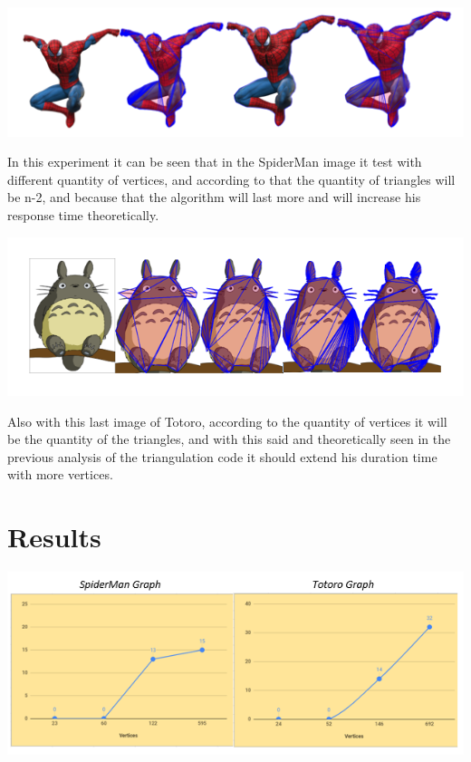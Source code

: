 \documentclass[conference]{IEEEtran}
\begin{document}
\includegraphics[scale=0.6]{spideyresults.png}

In this experiment it can be seen that in the SpiderMan image it test with different quantity of vertices, and according to that the quantity of triangles will be n-2, and because that the algorithm will last more and will increase his response time theoretically.

\includegraphics[scale=0.53]{totoroResults.png}

Also with this last image of Totoro, according to the quantity of vertices it will be the quantity of the triangles, and with this said and theoretically seen in the previous analysis of the triangulation code it should extend his duration time with more vertices.

\section{Results}

\includegraphics[scale=0.58]{Graphs.png}
\end{document}
